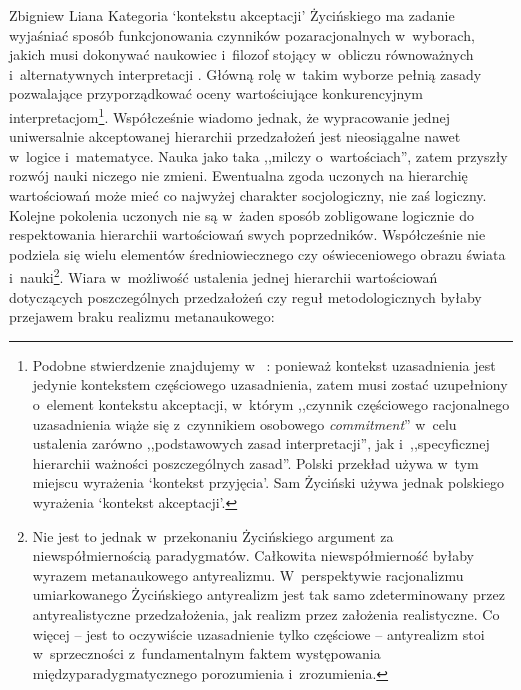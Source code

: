 \begin{artplenv}{Zbigniew Liana}
Kategoria ‘kontekstu akceptacji' Życińskiego ma zadanie wyjaśniać sposób funkcjonowania czynników pozaracjonalnych w~wyborach, jakich musi dokonywać naukowiec i~filozof stojący w~obliczu równoważnych i~alternatywnych interpretacji
\parencite[][s.~225nn]{zycinski_teizm_1985}. %
 Główną rolę w~takim wyborze pełnią zasady pozwalające przyporządkować oceny wartościujące konkurencyjnym interpretacjom\footnote{Podobne stwierdzenie znajdujemy w~%
\parencites[][s.~137]{zycinski_structure_1988}[][s.~242n]{zycinski_struktura_2013_liana}: %
 ponieważ kontekst uzasadnienia jest jedynie kontekstem częściowego uzasadnienia, zatem musi zostać uzupełniony o~element kontekstu akceptacji, w~którym ,,czynnik częściowego racjonalnego uzasadnienia wiąże się z~czynnikiem osobowego \textit{commitment}'' w~celu ustalenia zarówno ,,podstawowych zasad interpretacji'', jak i~,,specyficznej hierarchii ważności poszczególnych zasad''. Polski przekład 
\parencite[][s.~243]{zycinski_struktura_2013_liana} %
 używa w~tym miejscu wyrażenia ‘kontekst przyjęcia'. Sam Życiński używa jednak polskiego wyrażenia ‘kontekst akceptacji'.}. Współcześnie wiadomo jednak, że wypracowanie jednej uniwersalnie akceptowanej hierarchii przedzałożeń jest nieosiągalne nawet w~logice i~matematyce. Nauka jako taka ,,milczy o~wartościach'', zatem przyszły rozwój nauki niczego nie zmieni. Ewentualna zgoda uczonych na hierarchię wartościowań może mieć co najwyżej charakter socjologiczny, nie zaś logiczny. Kolejne pokolenia uczonych nie są w~żaden sposób zobligowane logicznie do respektowania hierarchii wartościowań swych poprzedników. Współcześnie nie podziela się wielu elementów średniowiecznego czy oświeceniowego obrazu świata i~nauki\footnote{Nie jest to jednak w~przekonaniu Życińskiego argument za niewspółmiernością paradygmatów. Całkowita niewspółmierność byłaby wyrazem metanaukowego antyrealizmu. W~perspektywie racjonalizmu umiarkowanego Życińskiego antyrealizm jest tak samo zdeterminowany przez antyrealistyczne przedzałożenia, jak realizm przez założenia realistyczne. Co więcej -- jest to oczywiście uzasadnienie tylko częściowe -- antyrealizm stoi w~sprzeczności z~fundamentalnym faktem występowania międzyparadygmatycznego porozumienia i~zrozumienia.}. Wiara w~możliwość ustalenia jednej hierarchii wartościowań dotyczących poszczególnych przedzałożeń czy reguł metodologicznych byłaby przejawem braku realizmu metanaukowego:


\end{artplenv}
